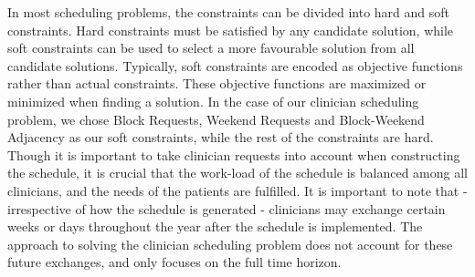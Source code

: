In most scheduling problems, the constraints can be divided into hard and soft
constraints. Hard constraints must be satisfied by any candidate solution, while
soft constraints can be used to select a more favourable solution from all
candidate solutions. Typically, soft constraints are encoded as objective
functions rather than actual constraints. These objective functions are
maximized or minimized when finding a solution. In the case of our clinician
scheduling problem, we chose Block Requests, Weekend Requests and Block-Weekend
Adjacency as our soft constraints, while the rest of the constraints are hard.
Though it is important to take clinician requests into account when constructing
the schedule, it is crucial that the work-load of the schedule is balanced among
all clinicians, and the needs of the patients are fulfilled. It is important to
note that - irrespective of how the schedule is generated - clinicians may
exchange certain weeks or days throughout the year after the schedule is
implemented. The approach to solving the clinician scheduling problem does not
account for these future exchanges, and only focuses on the full time horizon.
